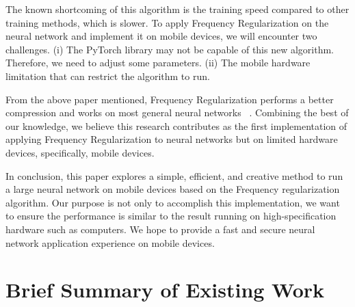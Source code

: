 \documentclass{article}
\begin{document}

The known shortcoming of this algorithm is the training speed compared to other training methods, which is slower. To apply Frequency Regularization on the neural network and implement it on mobile devices, we will encounter two challenges. (i) The PyTorch library may not be capable of this new algorithm. Therefore, we need to adjust some parameters. (ii) The mobile hardware limitation that can restrict the algorithm to run. 

From the above paper mentioned, Frequency Regularization performs a better compression and works on most general neural networks ~\cite{zhao2023frequency}. Combining the best of our knowledge, we believe this research contributes as the first implementation of applying Frequency Regularization to neural networks but on limited hardware devices, specifically, mobile devices.



In conclusion, this paper explores a simple, efficient, and creative method to run a large neural network on mobile devices based on the Frequency regularization algorithm. Our purpose is not only to accomplish this implementation, we want to ensure the performance is similar to the result running on high-specification hardware such as computers. We hope to provide a fast and secure neural network application experience on mobile devices.


\section{Brief Summary of Existing Work}
\end{document}
